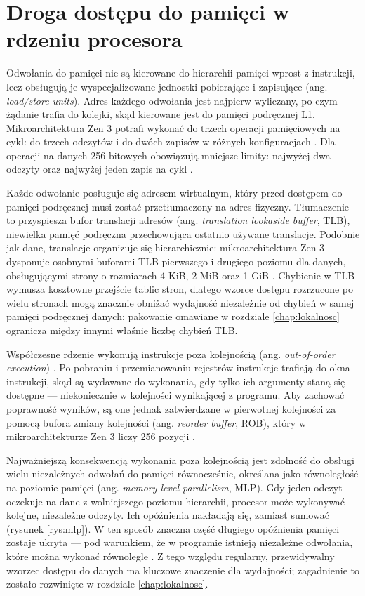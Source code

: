 \documentclass[a4paper,12pt]{book} %
\begin{document}
\section{Droga dostępu do pamięci w rdzeniu procesora}
\label{sec:droga}

Odwołania do pamięci nie są kierowane do hierarchii pamięci wprost z instrukcji, lecz obsługują je wyspecjalizowane jednostki pobierające i zapisujące (ang. \emph{load/store units}). Adres każdego odwołania jest najpierw wyliczany, po czym żądanie trafia do kolejki, skąd kierowane jest do pamięci podręcznej L1. Mikroarchitektura Zen 3 potrafi wykonać do trzech operacji pamięciowych na cykl: do trzech odczytów i do dwóch zapisów w różnych konfiguracjach \cite{evers2022zen3}. Dla operacji na danych 256-bitowych obowiązują mniejsze limity: najwyżej dwa odczyty oraz najwyżej jeden zapis na cykl \cite{amd_sog_19h}.

Każde odwołanie posługuje się adresem wirtualnym, który przed dostępem do pamięci podręcznej musi zostać przetłumaczony na adres fizyczny. Tłumaczenie to przyspiesza bufor translacji adresów (ang. \emph{translation lookaside buffer}, TLB), niewielka pamięć podręczna przechowująca ostatnio używane translacje. Podobnie jak dane, translacje organizuje się hierarchicznie: mikroarchitektura Zen 3 dysponuje osobnymi buforami TLB pierwszego i drugiego poziomu dla danych, obsługującymi strony o rozmiarach 4 KiB, 2 MiB oraz 1 GiB \cite{amd_sog_19h}. Chybienie w TLB wymusza kosztowne przejście tablic stron, dlatego wzorce dostępu rozrzucone po wielu stronach mogą znacznie obniżać wydajność niezależnie od chybień w samej pamięci podręcznej danych; pakowanie omawiane w rozdziale \ref{chap:lokalnosc} ogranicza między innymi właśnie liczbę chybień TLB.

Współczesne rdzenie wykonują instrukcje poza kolejnością (ang. \emph{out-of-order execution}) \cite{hennessy2017architecture}. Po pobraniu i przemianowaniu rejestrów instrukcje trafiają do okna instrukcji, skąd są wydawane do wykonania, gdy tylko ich argumenty staną się dostępne --- niekoniecznie w kolejności wynikającej z programu. Aby zachować poprawność wyników, są one jednak zatwierdzane w pierwotnej kolejności za pomocą bufora zmiany kolejności (ang. \emph{reorder buffer}, ROB), który w mikroarchitekturze Zen 3 liczy 256 pozycji \cite{evers2022zen3}.

Najważniejszą konsekwencją wykonania poza kolejnością jest zdolność do obsługi wielu niezależnych odwołań do pamięci równocześnie, określana jako równoległość na poziomie pamięci (ang. \emph{memory-level parallelism}, MLP). Gdy jeden odczyt oczekuje na dane z wolniejszego poziomu hierarchii, procesor może wykonywać kolejne, niezależne odczyty. Ich opóźnienia nakładają się, zamiast sumować (rysunek \ref{rys:mlp}). W ten sposób znaczna część długiego opóźnienia pamięci zostaje ukryta --- pod warunkiem, że w programie istnieją niezależne odwołania, które można wykonać równolegle \cite{drepper2007memory}. Z tego względu regularny, przewidywalny wzorzec dostępu do danych ma kluczowe znaczenie dla wydajności; zagadnienie to zostało rozwinięte w rozdziale \ref{chap:lokalnosc}.
\end{document}
